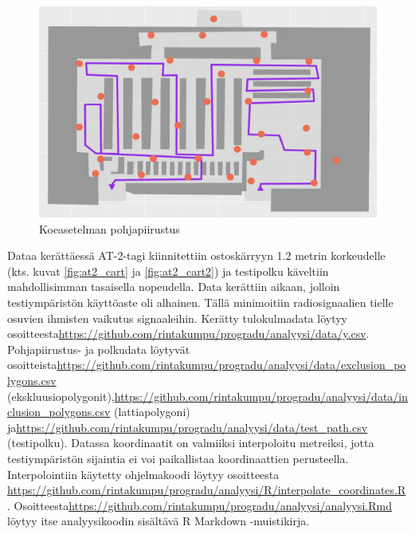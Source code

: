 \documentclass[
  12pt,
  a4paper, twoside]{book}
\begin{document}
\begin{figure}[H]
\centering
\includegraphics[width=15cm]{testipolku_numeroimaton}
\caption{Koeasetelman pohjapiirustus}
\label{fig:testipolku}
\end{figure}

\noindent Dataa kerättäessä AT-2-tagi kiinnitettiin ostoskärryyn 1.2 metrin korkeudelle (kts. kuvat \ref{fig:at2_cart} ja \ref{fig:at2_cart2}) ja testipolku käveltiin mahdollisimman tasaisella nopeudella. Data kerättiin aikaan, jolloin testiympäristön käyttöaste oli alhainen. Tällä minimoitiin radiosignaalien tielle osuvien ihmisten vaikutus signaaleihin. Kerätty tulokulmadata löytyy osoitteesta\newline \url{https://github.com/rintakumpu/progradu/analyysi/data/y.csv}. Pohjapiirustus- ja polkudata löytyvät osoitteista\newline \url{https://github.com/rintakumpu/progradu/analyysi/data/exclusion_polygons.csv} (ekskluusiopolygonit),\newline \url{https://github.com/rintakumpu/progradu/analyysi/data/inclusion_polygons.csv} (lattiapolygoni) ja\newline \url{https://github.com/rintakumpu/progradu/analyysi/data/test_path.csv} (testipolku). Datassa koordinaatit on valmiiksi interpoloitu metreiksi, jotta testiympäristön sijaintia ei voi paikallistaa koordinaattien perusteella. Interpolointiin käytetty ohjelmakoodi löytyy osoitteesta \newline \url{https://github.com/rintakumpu/progradu/analyysi/R/interpolate_coordinates.R} . Osoitteesta\newline \url{https://github.com/rintakumpu/progradu/analyysi/analyysi.Rmd} löytyy itse analyysikoodin sisältävä R Markdown -muistikirja.
\end{document}
